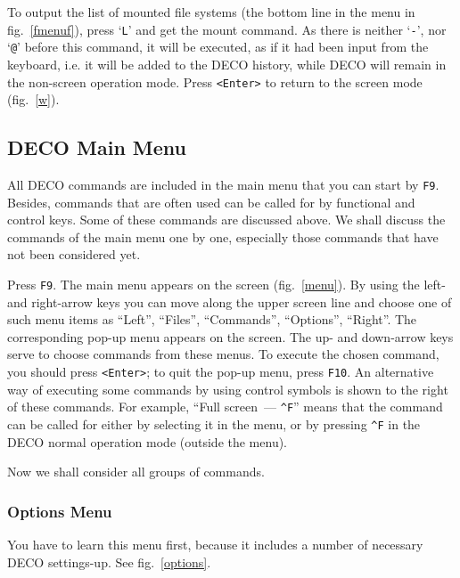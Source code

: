 
To output the list of mounted file systems (the bottom line in the menu in
fig.~\ref{fmenuf}), press `{\tt L}' and get the mount command. As there is
neither `{\tt -}', nor `{\tt @}' before this command, it will be
executed, as if it had been input from the keyboard, i.e. it will be
added to the DECO history, while DECO will remain in the non-screen
operation mode. Press {\tt <Enter>} to return to the screen mode (fig.~\ref{w}).

\subsection{DECO Main Menu}

All DECO commands are included in the main menu that you can start by
{\tt F9}. Besides, commands that are often used can be called for by
functional and control keys. Some of these commands are discussed above.
We shall discuss the commands of the main menu one by one, especially those
commands that have not been considered yet.

Press {\tt F9}. The main menu appears on the screen (fig.~\ref{menu}).
By using the left- and right-arrow keys you can move along the upper screen
line and choose one of such menu items as ``Left'', ``Files'', ``Commands'',
``Options'', ``Right''. The corresponding pop-up menu appears on the
screen. The up- and down-arrow keys serve to choose commands from these menus.
To execute the chosen command, you should press {\tt <Enter>}; to quit
the pop-up menu, press {\tt F10}. An alternative way of executing some commands
by using control symbols is shown to the right of these commands. For
example, ``Full screen~--- {\tt \^{}F}'' means that the command can be
called for either by selecting it in the menu, or by pressing {\tt \^{}F} in the
DECO normal operation mode (outside the menu).

Now we shall consider all groups of commands.

\subsubsection{Options Menu}

You have to learn this menu first, because it includes  
a number of necessary DECO settings-up. See fig.~\ref{options}.
 

